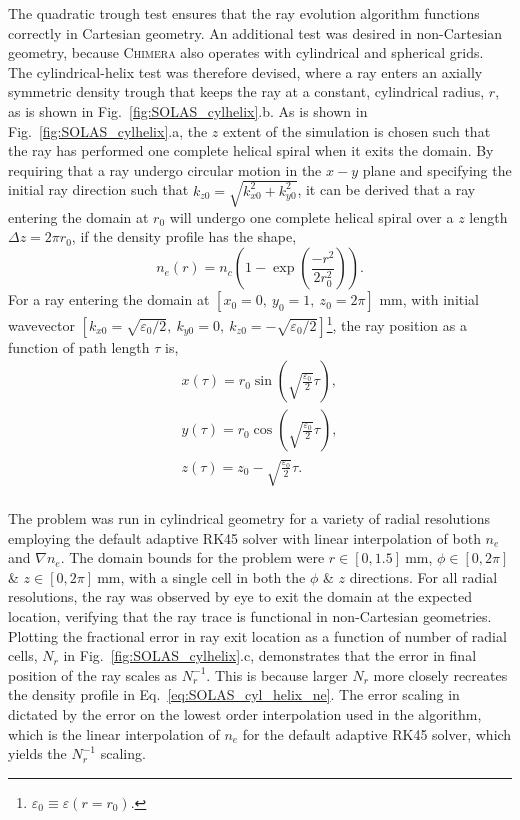 The quadratic trough test ensures that the ray evolution algorithm functions correctly in Cartesian geometry.
An additional test was desired in non-Cartesian geometry, because \textsc{Chimera} also operates with cylindrical and spherical grids.
The cylindrical-helix test was therefore devised, where a ray enters an axially symmetric density trough that keeps the ray at a constant, cylindrical radius, $r$, as is shown in Fig.~\ref{fig:SOLAS_cylhelix}.b.
As is shown in Fig.~\ref{fig:SOLAS_cylhelix}.a, the $z$ extent of the simulation is chosen such that the ray has performed one complete helical spiral when it exits the domain.
By requiring that a ray undergo circular motion in the $x-y$ plane and specifying the initial ray direction such that $k_{z0}=\sqrt{k_{x0}^2+k_{y0}^2}$, it can be derived that a ray entering the domain at $r_0$ will undergo one complete helical spiral over a $z$ length $\Delta z= 2\pi r_0$, if the density profile has the shape,
\begin{equation}
    \label{eq:SOLAS_cyl_helix_ne}
    n_e(r) = n_c \left( 1-\exp{\left( \frac{-r^2}{2r_0^2} \right)} \right).
\end{equation}
For a ray entering the domain at $[x_0=0,\ y_0=1,\ z_0=2\pi]$ mm, with initial wavevector $[k_{x0}=\sqrt{\varepsilon_0/2},\ k_{y0}=0,\ k_{z0}=-\sqrt{\varepsilon_0/2}]$\footnote{$\varepsilon_0\equiv\varepsilon(r=r_0)$.}, the ray position as a function of path length $\tau$ is,
\begin{equation}
    \begin{gathered}
        x(\tau) = r_0\sin{\left( \sqrt{\frac{\varepsilon_0}{2}}\tau \right)}, \\
        y(\tau) = r_0\cos{\left( \sqrt{\frac{\varepsilon_0}{2}}\tau \right)}, \\
        z(\tau) = z_0 - \sqrt{\frac{\varepsilon_0}{2}}\tau. \\
    \end{gathered}
\end{equation}

The problem was run in cylindrical geometry for a variety of radial resolutions employing the default adaptive RK45 solver with linear interpolation of both $n_e$ and $\nabla n_e$.
The domain bounds for the problem were $r \in [0,1.5]\ \text{mm}$, $\phi \in [0,2\pi]$ \& $z \in [0,2\pi]\ \text{mm}$, with a single cell in both the $\phi$ \& $z$ directions.
For all radial resolutions, the ray was observed by eye to exit the domain at the expected location, verifying that the ray trace is functional in non-Cartesian geometries.
Plotting the fractional error in ray exit location as a function of number of radial cells, $N_r$ in Fig.~\ref{fig:SOLAS_cylhelix}.c, demonstrates that the error in final position of the ray scales as $N_r^{-1}$.
This is because larger $N_r$ more closely recreates the density profile in Eq.~\ref{eq:SOLAS_cyl_helix_ne}.
The error scaling in dictated by the error on the lowest order interpolation used in the algorithm, which is the linear interpolation of $n_e$ for the default adaptive RK45 solver, which yields the $N_r^{-1}$ scaling.

